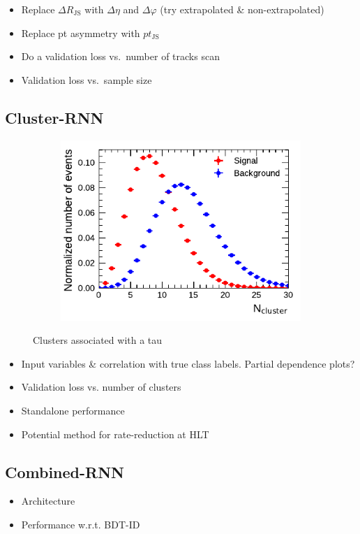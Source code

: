 \begin{itemize}
\item Replace $\Delta R_\mathrm{JS}$ with $\Delta \eta$ and $\Delta \varphi$
  (try extrapolated \& non-extrapolated)
\item Replace pt asymmetry with $pt_\mathrm{JS}$
\item Do a validation loss vs.\ number of tracks scan
\item Validation loss vs.\ sample size
\end{itemize}

\subsection{Cluster-RNN}
\label{sec:rnn_clusters}

\begin{figure}[ht]
  \begin{subfigure}[t]{0.5\textwidth}
    \centering
    \includegraphics{./figures/rnn/ncls_1p.pdf}
  \end{subfigure}%
  \begin{subfigure}[t]{0.5\textwidth}
    \centering
  \end{subfigure}
  \caption{Clusters associated with a tau}
  \label{fig:rnn_nclusters}
\end{figure}

\begin{itemize}
\item Input variables \& correlation with true class labels. Partial
  dependence plots?
\item Validation loss vs. number of clusters
\item Standalone performance
\item Potential method for rate-reduction at HLT
\end{itemize}


\subsection{Combined-RNN}
\label{sec:rnn_combined}

\begin{itemize}
\item Architecture
\item Performance w.r.t. BDT-ID
\end{itemize}


